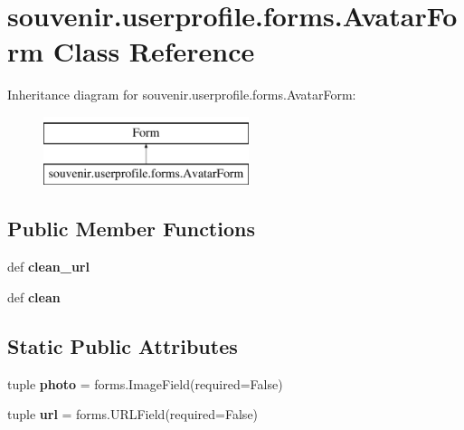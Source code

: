 \hypertarget{classsouvenir_1_1userprofile_1_1forms_1_1AvatarForm}{\section{souvenir.\-userprofile.\-forms.\-Avatar\-Form Class Reference}
\label{classsouvenir_1_1userprofile_1_1forms_1_1AvatarForm}
}
Inheritance diagram for souvenir.\-userprofile.\-forms.\-Avatar\-Form\-:\begin{figure}[H]
\begin{center}
\leavevmode
\includegraphics[height=2.000000cm]{classsouvenir_1_1userprofile_1_1forms_1_1AvatarForm}
\end{center}
\end{figure}
\subsection*{Public Member Functions}
\begin{DoxyCompactItemize}
\item 
\hypertarget{classsouvenir_1_1userprofile_1_1forms_1_1AvatarForm_a37fb71d894e6383f530fa1d50d087392}{def {\bfseries clean\-\_\-url}}\label{classsouvenir_1_1userprofile_1_1forms_1_1AvatarForm_a37fb71d894e6383f530fa1d50d087392}

\item 
\hypertarget{classsouvenir_1_1userprofile_1_1forms_1_1AvatarForm_afb4ede933c3ba17ef9d7a3c0dcc83a9f}{def {\bfseries clean}}\label{classsouvenir_1_1userprofile_1_1forms_1_1AvatarForm_afb4ede933c3ba17ef9d7a3c0dcc83a9f}

\end{DoxyCompactItemize}
\subsection*{Static Public Attributes}
\begin{DoxyCompactItemize}
\item 
\hypertarget{classsouvenir_1_1userprofile_1_1forms_1_1AvatarForm_a87126e97b3fecac55cbc72ce7ea5d56d}{tuple {\bfseries photo} = forms.\-Image\-Field(required=False)}\label{classsouvenir_1_1userprofile_1_1forms_1_1AvatarForm_a87126e97b3fecac55cbc72ce7ea5d56d}

\item 
\hypertarget{classsouvenir_1_1userprofile_1_1forms_1_1AvatarForm_a91ed4c842d9c9c5218909689e1947322}{tuple {\bfseries url} = forms.\-U\-R\-L\-Field(required=False)}\label{classsouvenir_1_1userprofile_1_1forms_1_1AvatarForm_a91ed4c842d9c9c5218909689e1947322}

\end{DoxyCompactItemize}


